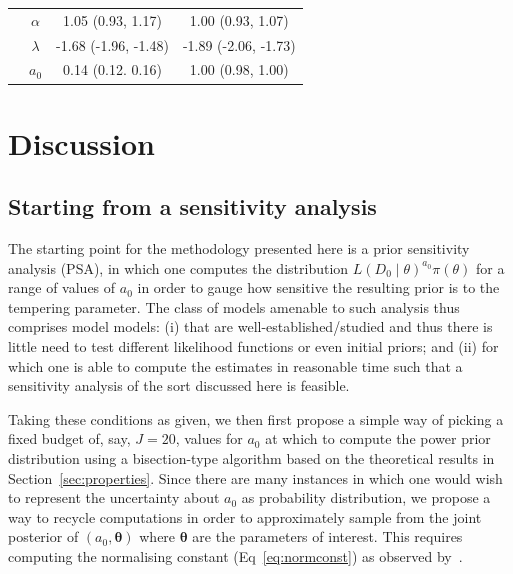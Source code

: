 \documentclass[a4paper, notitlepage, 11pt]{article}
\begin{document}
\begin{table}[!ht]
\begin{tabular}{cccc}
                                            & $\alpha$  & 1.05 (0.93, 1.17)    & 1.00 (0.93, 1.07)           \\
                                            & $\lambda$ & -1.68 (-1.96, -1.48) & -1.89 (-2.06, -1.73)        \\
                                            & $a_0$     & 0.14 (0.12. 0.16)    & 1.00 (0.98, 1.00)           \\
\hline                                            
\end{tabular}
\label{tab:survival_results}
\end{table}

\section{Discussion}
\label{sec:discussion}

\subsection{Starting from a sensitivity analysis}
\label{sec:sensitivity_analysis}

The starting point for the methodology presented here is a prior sensitivity analysis (PSA), in which one computes the distribution $L(D_0 \mid \theta)^{a_0}\pi(\theta)$ for a range of values of $a_0$ in order to gauge how sensitive the resulting prior is to the tempering parameter. 
The class of models amenable to such analysis thus comprises model models: (i) that are well-established/studied and thus there is little need to test different likelihood functions or even initial priors; and (ii) for which one is able to compute the estimates in reasonable time such that a sensitivity analysis of the sort discussed here is feasible. 

Taking these conditions as given, we then first propose a simple way of picking a fixed budget of, say, $J=20$, values for $a_0$ at which to compute the power prior distribution using a bisection-type algorithm based on the theoretical results in Section~\ref{sec:properties}.
Since there are many instances in which one would wish to represent the uncertainty about $a_0$ as probability distribution, we propose a way to recycle computations in order to approximately sample from the joint posterior of $(a_0, \boldsymbol{\theta})$ where $\boldsymbol{\theta}$ are the parameters of interest.
This requires computing the normalising constant (Eq~\ref{eq:normconst}) as observed by~\cite{Neuenschwander2009}.
\end{document}
